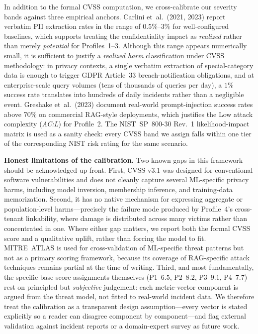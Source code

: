 \documentclass[11pt,a4paper]{report}
\begin{document}
In addition to the formal CVSS computation, we cross-calibrate our
severity bands against three empirical anchors. Carlini et~al.\ (2021,
2023) report verbatim PII extraction rates in the range of
$0.5\%$--$3\%$ for well-configured baselines, which supports treating the
confidentiality impact as \emph{realized} rather than merely
\emph{potential} for Profiles~1--3. Although this range appears
numerically small, it is sufficient to justify a \emph{realized harm}
classification under CVSS methodology: in privacy contexts, a single
verbatim extraction of special-category data is enough to trigger GDPR
Article~33 breach-notification obligations, and at enterprise-scale
query volumes (tens of thousands of queries per day), a $1\%$ success
rate translates into hundreds of daily incidents rather than a
negligible event. Greshake et~al.\ (2023) document real-world
prompt-injection success rates above $70\%$ on commercial RAG-style
deployments, which justifies the Low attack complexity (\emph{AC:L})
for Profile~2. The NIST~SP~800-30 Rev.~1 likelihood-impact matrix is
used as a sanity check: every CVSS band we assign falls within one
tier of the corresponding NIST risk rating for the same scenario.

\begin{limitbox}
\small\textbf{Honest limitations of the calibration.} Two known gaps
in this framework should be acknowledged up front. First, CVSS v3.1
was designed for conventional software vulnerabilities and does not
cleanly capture several ML-specific privacy harms, including model
inversion, membership inference, and training-data memorization.
Second, it has no native mechanism for expressing aggregate or
population-level harms---precisely the failure mode produced by
Profile~4's cross-tenant linkability, where damage is distributed
across many victims rather than concentrated in one. Where either gap
matters, we report both the formal CVSS score and a qualitative
uplift, rather than forcing the model to fit. MITRE~ATLAS is used for
cross-validation of ML-specific threat patterns but not as a primary
scoring framework, because its coverage of RAG-specific attack
techniques remains partial at the time of writing. Third, and most
fundamentally, the specific base-score assignments themselves (P1~$6.5$,
P2~$8.2$, P3~$9.1$, P4~$7.7$) rest on principled but \emph{subjective}
judgement: each metric-vector component is argued from the threat model,
not fitted to real-world incident data. We therefore treat the calibration
as a transparent design assumption---every vector is stated explicitly so a
reader can disagree component by component---and flag external validation
against incident reports or a domain-expert survey as future work.
\end{limitbox}
\end{document}
